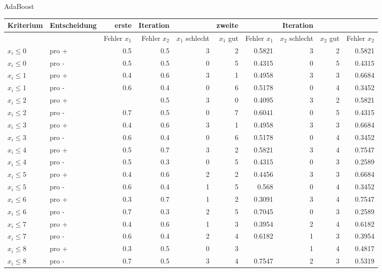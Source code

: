 \begin{task}[credit=15]{AdaBoost}
\begin{subtask}[title=Algorithmus,points=12]
\begin{solution}
\begin{table}[h]
	\centering
	\begin{tabular}{ll|rr|rrrrrr}
		Kriterium & Entscheidung & erste & Iteration &  & zweite &  & Iteration & & \\
		\hline
		& & Fehler $x_1$ & Fehler $x_2$ & $x_1$ schlecht & $x_1$ gut& Fehler $x_1$ & $x_2$ schlecht & $x_2$ gut & Fehler $x_2$ \\
		$x_i \leq 0$ & pro + & 0.5 & 0.5 & 3 &2 & 0.5821 & 3 &2 & 0.5821\\
		$x_i \leq 0$ & pro - & 0.5 & 0.5 & 0 &5 & 0.4315 & 0 &5 & 0.4315\\
		$x_i \leq 1$ & pro + & 0.4 & 0.6 & 3 &1 & 0.4958 & 3 &3 & 0.6684 \\
		$x_i \leq 1$ & pro - & 0.6 & 0.4 & 0 &6 & 0.5178 & 0 &4 & 0.3452 \\
		$x_i \leq 2$ & pro + & \fbox{0.3} & 0.5 & 3 &0 & 0.4095 & 3 &2 & 0.5821 \\
		$x_i \leq 2$ & pro - & 0.7 & 0.5 & 0 &7 & 0.6041 & 0 &5 & 0.4315\\
		
		$x_i \leq 3$ & pro + & 0.4 & 0.6 & 3 &1 & 0.4958 & 3 &3 & 0.6684 \\
		$x_i \leq 3$ & pro - & 0.6 & 0.4 & 0 &6 & 0.5178 & 0 &4 & 0.3452\\
		
		$x_i \leq 4$ & pro + & 0.5 & 0.7 & 3 &2 & 0.5821 & 3 &4 & 0.7547 \\
		$x_i \leq 4$ & pro - & 0.5 & 0.3 & 0 &5 & 0.4315 & 0 &3 & 0.2589 \\
		
		$x_i \leq 5$ & pro + & 0.4 & 0.6 & 2 &2 & 0.4456 & 3 &3 & 0.6684 \\
		$x_i \leq 5$ & pro - & 0.6 & 0.4 & 1 &5 & 0.568  & 0 &4 & 0.3452 \\
		
		$x_i \leq 6$ & pro + & 0.3 & 0.7 & 1 &2 & 0.3091 & 3 &4 & 0.7547 \\
		$x_i \leq 6$ & pro - & 0.7 & 0.3 & 2 &5 & 0.7045 & 0 &3 & 0.2589 \\
		
		$x_i \leq 7$ & pro + & 0.4 & 0.6 & 1 &3 & 0.3954 & 2 &4 & 0.6182 \\
		$x_i \leq 7$ & pro - & 0.6 & 0.4 & 2 &4 & 0.6182 & 1 &3 & 0.3954 \\
		
		$x_i \leq 8$ & pro + & 0.3 & 0.5 & 0 &3 & \fbox{0.2589} & 1 &4& 0.4817 \\
		$x_i \leq 8$ & pro - & 0.7 & 0.5 & 3 &4 & 0.7547 & 2 &3 & 0.5319 \\
		

\end{tabular}
\end{table}
\end{solution}
\end{subtask}
\end{task}
